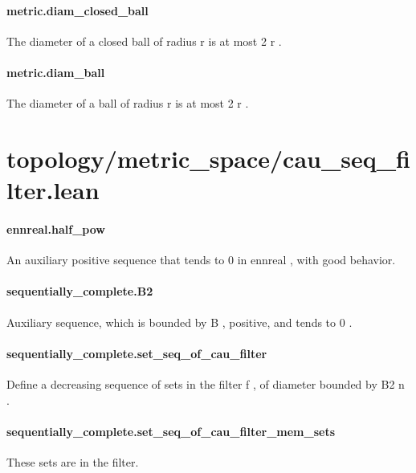 \documentclass{article}
\begin{document}
\paragraph{metric.diam\_closed\_ball}
\par
The diameter of a closed ball of radius 
\colorbox[RGB]{253,246,227}{{{{\color[RGB]{101, 123, 131} r }}}} is at most 
\colorbox[RGB]{253,246,227}{{{{\color[RGB]{108, 113, 196} 2 }}}{{{\color[RGB]{101, 123, 131}  r }}}}.
\paragraph{metric.diam\_ball}
\par
The diameter of a ball of radius 
\colorbox[RGB]{253,246,227}{{{{\color[RGB]{101, 123, 131} r }}}} is at most 
\colorbox[RGB]{253,246,227}{{{{\color[RGB]{108, 113, 196} 2 }}}{{{\color[RGB]{101, 123, 131}  r }}}}.
\section{topology/metric\_space/cau\_seq\_filter.lean}\paragraph{ennreal.half\_pow}
\par
An auxiliary positive sequence that tends to 
\colorbox[RGB]{253,246,227}{{{{\color[RGB]{108, 113, 196} 0 }}}} in 
\colorbox[RGB]{253,246,227}{{{{\color[RGB]{101, 123, 131} ennreal }}}}, with good behavior.
\paragraph{sequentially\_complete.B2}
\par
Auxiliary sequence, which is bounded by 
\colorbox[RGB]{253,246,227}{{{{\color[RGB]{101, 123, 131} B }}}}, positive, and tends to 
\colorbox[RGB]{253,246,227}{{{{\color[RGB]{108, 113, 196} 0 }}}}.
\paragraph{sequentially\_complete.set\_seq\_of\_cau\_filter}
\par
Define a decreasing sequence of sets in the filter 
\colorbox[RGB]{253,246,227}{{{{\color[RGB]{101, 123, 131} f }}}}, of diameter bounded by 
\colorbox[RGB]{253,246,227}{{{{\color[RGB]{101, 123, 131} B2 n }}}}.
\paragraph{sequentially\_complete.set\_seq\_of\_cau\_filter\_mem\_sets}
\par
These sets are in the filter.
\end{document}
